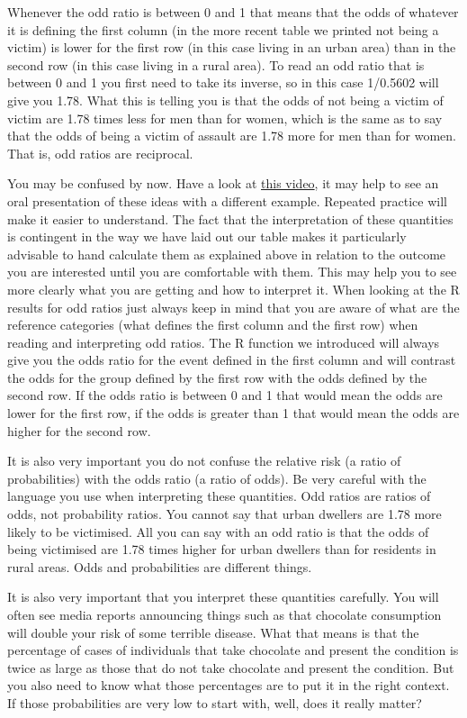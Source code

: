 \documentclass[]{book}
\theoremstyle{definition}
\theoremstyle{definition}
\theoremstyle{definition}
\theoremstyle{remark}
\begin{document}
Whenever the odd ratio is between 0 and 1 that means that the odds of
whatever it is defining the first column (in the more recent table we
printed not being a victim) is lower for the first row (in this case
living in an urban area) than in the second row (in this case living in
a rural area). To read an odd ratio that is between 0 and 1 you first
need to take its inverse, so in this case 1/0.5602 will give you 1.78.
What this is telling you is that the odds of not being a victim of
victim are 1.78 times less for men than for women, which is the same as
to say that the odds of being a victim of assault are 1.78 more for men
than for women. That is, odd ratios are reciprocal.

You may be confused by now. Have a look at
\href{https://www.youtube.com/watch?v=nFHL54yOniI}{this video}, it may
help to see an oral presentation of these ideas with a different
example. Repeated practice will make it easier to understand. The fact
that the interpretation of these quantities is contingent in the way we
have laid out our table makes it particularly advisable to hand
calculate them as explained above in relation to the outcome you are
interested until you are comfortable with them. This may help you to see
more clearly what you are getting and how to interpret it. When looking
at the R results for odd ratios just always keep in mind that you are
aware of what are the reference categories (what defines the first
column and the first row) when reading and interpreting odd ratios. The
R function we introduced will always give you the odds ratio for the
event defined in the first column and will contrast the odds for the
group defined by the first row with the odds defined by the second row.
If the odds ratio is between 0 and 1 that would mean the odds are lower
for the first row, if the odds is greater than 1 that would mean the
odds are higher for the second row.

It is also very important you do not confuse the relative risk (a ratio
of probabilities) with the odds ratio (a ratio of odds). Be very careful
with the language you use when interpreting these quantities. Odd ratios
are ratios of odds, not probability ratios. You cannot say that urban
dwellers are 1.78 more likely to be victimised. All you can say with an
odd ratio is that the odds of being victimised are 1.78 times higher for
urban dwellers than for residents in rural areas. Odds and probabilities
are different things.

It is also very important that you interpret these quantities carefully.
You will often see media reports announcing things such as that
chocolate consumption will double your risk of some terrible disease.
What that means is that the percentage of cases of individuals that take
chocolate and present the condition is twice as large as those that do
not take chocolate and present the condition. But you also need to know
what those percentages are to put it in the right context. If those
probabilities are very low to start with, well, does it really matter?
\end{document}
